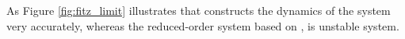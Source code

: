 %	
%	
As Figure \ref{fig:fitz_limit} illustrates that {\redQBbal} constructs the dynamics of the system very accurately, whereas the reduced-order system based on \GramB, {\redBbal} is  unstable system.

